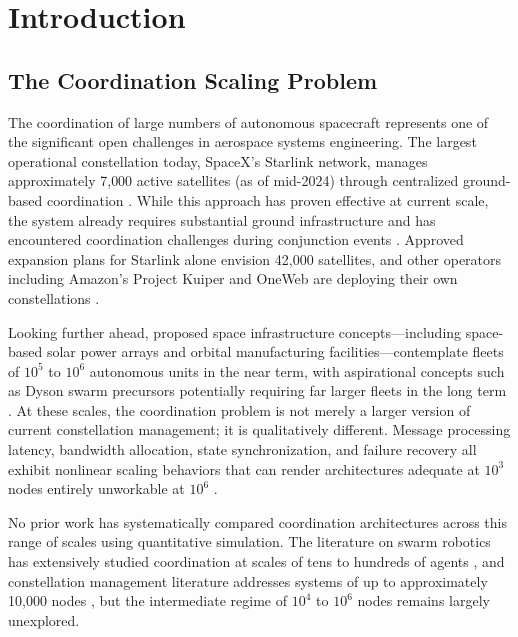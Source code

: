 \documentclass[journal]{IEEEtran}
\begin{document}
\section{Introduction}

\subsection{The Coordination Scaling Problem}

The coordination of large numbers of autonomous spacecraft represents one of the significant open challenges in aerospace systems engineering. The largest operational constellation today, SpaceX's Starlink network, manages approximately 7{,}000 active satellites (as of mid-2024) through centralized ground-based coordination \cite{starlink_ops}. While this approach has proven effective at current scale, the system already requires substantial ground infrastructure and has encountered coordination challenges during conjunction events \cite{esa_conjunction}. Approved expansion plans for Starlink alone envision 42{,}000 satellites, and other operators including Amazon's Project Kuiper and OneWeb are deploying their own constellations \cite{kuiper, oneweb_mgmt}.

Looking further ahead, proposed space infrastructure concepts---including space-based solar power arrays and orbital manufacturing facilities---contemplate fleets of $10^5$ to $10^6$ autonomous units in the near term, with aspirational concepts such as Dyson swarm precursors potentially requiring far larger fleets in the long term \cite{oneil_1976, badescu_2006}. At these scales, the coordination problem is not merely a larger version of current constellation management; it is qualitatively different. Message processing latency, bandwidth allocation, state synchronization, and failure recovery all exhibit nonlinear scaling behaviors that can render architectures adequate at $10^3$ nodes entirely unworkable at $10^6$ \cite{lynch_distributed}.

No prior work has systematically compared coordination architectures across this range of scales using quantitative simulation. The literature on swarm robotics has extensively studied coordination at scales of tens to hundreds of agents \cite{brambilla_2013}, and constellation management literature addresses systems of up to approximately 10{,}000 nodes \cite{wertz_smad}, but the intermediate regime of $10^4$ to $10^6$ nodes remains largely unexplored.
\end{document}
